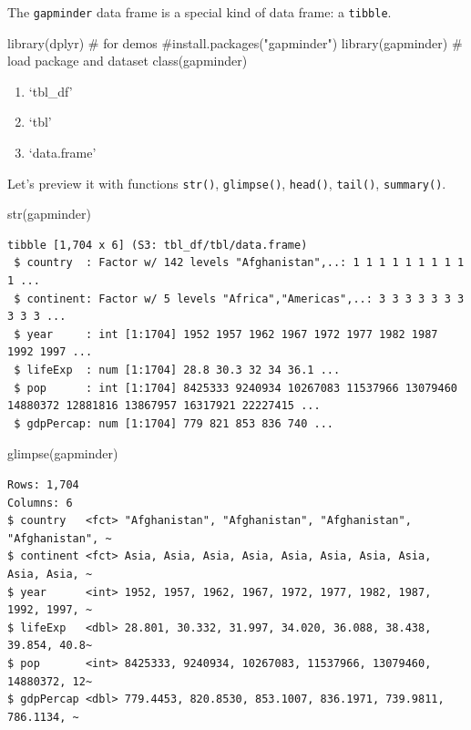 \documentclass[
  letterpaper,
  DIV=11,
  numbers=noendperiod]{scrreprt}
\newenvironment{Shaded}{\begin{snugshade}}{\end{snugshade}}
\newcommand{\CommentTok}[1]{\textcolor[rgb]{0.37,0.37,0.37}{#1}}
\newcommand{\FunctionTok}[1]{\textcolor[rgb]{0.28,0.35,0.67}{#1}}
\newcommand{\NormalTok}[1]{\textcolor[rgb]{0.00,0.23,0.31}{#1}}
\providecommand{\tightlist}{%
  \setlength{\itemsep}{0pt}\setlength{\parskip}{0pt}}\usepackage{longtable,booktabs,array}
\begin{document}
The \texttt{gapminder} data frame is a special kind of data frame: a
\texttt{tibble}.

\begin{Shaded}
\begin{Highlighting}[]
\FunctionTok{library}\NormalTok{(dplyr) }\CommentTok{\# for demos}
\CommentTok{\#install.packages("gapminder")}
\FunctionTok{library}\NormalTok{(gapminder)  }\CommentTok{\# load package and dataset}
\FunctionTok{class}\NormalTok{(gapminder)}
\end{Highlighting}
\end{Shaded}

\begin{enumerate}
\def\labelenumi{\arabic{enumi}.}
\tightlist
\item
  `tbl\_df'
\item
  `tbl'
\item
  `data.frame'
\end{enumerate}

Let's preview it with functions \texttt{str()}, \texttt{glimpse()},
\texttt{head()}, \texttt{tail()}, \texttt{summary()}.

\begin{Shaded}
\begin{Highlighting}[]
\FunctionTok{str}\NormalTok{(gapminder)}
\end{Highlighting}
\end{Shaded}

\begin{verbatim}
tibble [1,704 x 6] (S3: tbl_df/tbl/data.frame)
 $ country  : Factor w/ 142 levels "Afghanistan",..: 1 1 1 1 1 1 1 1 1 1 ...
 $ continent: Factor w/ 5 levels "Africa","Americas",..: 3 3 3 3 3 3 3 3 3 3 ...
 $ year     : int [1:1704] 1952 1957 1962 1967 1972 1977 1982 1987 1992 1997 ...
 $ lifeExp  : num [1:1704] 28.8 30.3 32 34 36.1 ...
 $ pop      : int [1:1704] 8425333 9240934 10267083 11537966 13079460 14880372 12881816 13867957 16317921 22227415 ...
 $ gdpPercap: num [1:1704] 779 821 853 836 740 ...
\end{verbatim}

\begin{Shaded}
\begin{Highlighting}[]
\FunctionTok{glimpse}\NormalTok{(gapminder)}
\end{Highlighting}
\end{Shaded}

\begin{verbatim}
Rows: 1,704
Columns: 6
$ country   <fct> "Afghanistan", "Afghanistan", "Afghanistan", "Afghanistan", ~
$ continent <fct> Asia, Asia, Asia, Asia, Asia, Asia, Asia, Asia, Asia, Asia, ~
$ year      <int> 1952, 1957, 1962, 1967, 1972, 1977, 1982, 1987, 1992, 1997, ~
$ lifeExp   <dbl> 28.801, 30.332, 31.997, 34.020, 36.088, 38.438, 39.854, 40.8~
$ pop       <int> 8425333, 9240934, 10267083, 11537966, 13079460, 14880372, 12~
$ gdpPercap <dbl> 779.4453, 820.8530, 853.1007, 836.1971, 739.9811, 786.1134, ~
\end{verbatim}
\end{document}
